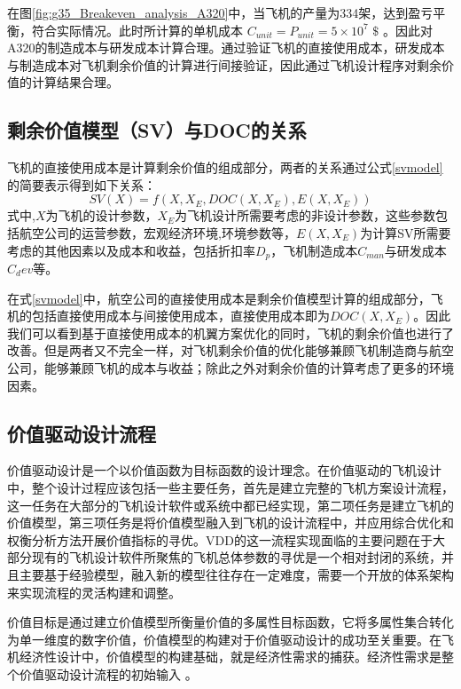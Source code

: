 \documentclass[12pt,a4paper]{report}
\begin{document}
在图\ref{fig:g35_Breakeven_analysis_A320}中，当飞机的产量为334架，达到盈亏平衡，符合实际情况。此时所计算的单机成本 
$ C_{unit}=P_{unit}=5 \times 10^{7} $ $\$$ 。因此对A320的制造成本与研发成本计算合理。通过验证飞机的直接使用成本，研发成本与制造成本对飞机剩余价值的计算进行间接验证，因此通过飞机设计程序对剩余价值的计算结果合理。

\subsection{剩余价值模型（SV）与DOC的关系}
飞机的直接使用成本是计算剩余价值的组成部分，两者的关系通过公式\ref{svmodel}的简要表示得到如下关系：
\begin{equation}
SV(X)=f(X,X_E, DOC(X,X_E), E(X,X_E))
\label{svmodel}
\end{equation}
式中,$X$为飞机的设计参数，$X_E$为飞机设计所需要考虑的非设计参数，这些参数包括航空公司的运营参数，宏观经济环境,环境参数等，$E(X,X_E)$为计算SV所需要考虑的其他因素以及成本和收益，包括折扣率$D_p$，飞机制造成本$C_{man}$与研发成本$C_dev$等。

在式\ref{svmodel}中，航空公司的直接使用成本是剩余价值模型计算的组成部分，飞机的包括直接使用成本与间接使用成本，直接使用成本即为$DOC(X,X_E)$。因此我们可以看到基于直接使用成本的机翼方案优化的同时，飞机的剩余价值也进行了改善。但是两者又不完全一样，对飞机剩余价值的优化能够兼顾飞机制造商与航空公司，能够兼顾飞机的成本与收益；除此之外对剩余价值的计算考虑了更多的环境因素。

\subsection{价值驱动设计流程}

价值驱动设计是一个以价值函数为目标函数的设计理念。在价值驱动的飞机设计中，整个设计过程应该包括一些主要任务，首先是建立完整的飞机方案设计流程，这一任务在大部分的飞机设计软件或系统中都已经实现，第二项任务是建立飞机的价值模型，第三项任务是将价值模型融入到飞机的设计流程中，并应用综合优化和权衡分析方法开展价值指标的寻优。VDD的这一流程实现面临的主要问题在于大部分现有的飞机设计软件所聚焦的飞机总体参数的寻优是一个相对封闭的系统，并且主要基于经验模型，融入新的模型往往存在一定难度，需要一个开放的体系架构来实现流程的灵活构建和调整。

价值目标是通过建立价值模型所衡量价值的多属性目标函数，它将多属性集合转化为单一维度的数字价值，价值模型的构建对于价值驱动设计的成功至关重要。在飞机经济性设计中，价值模型的构建基础，就是经济性需求的捕获。经济性需求是整个价值驱动设计流程的初始输入 。
\end{document}

